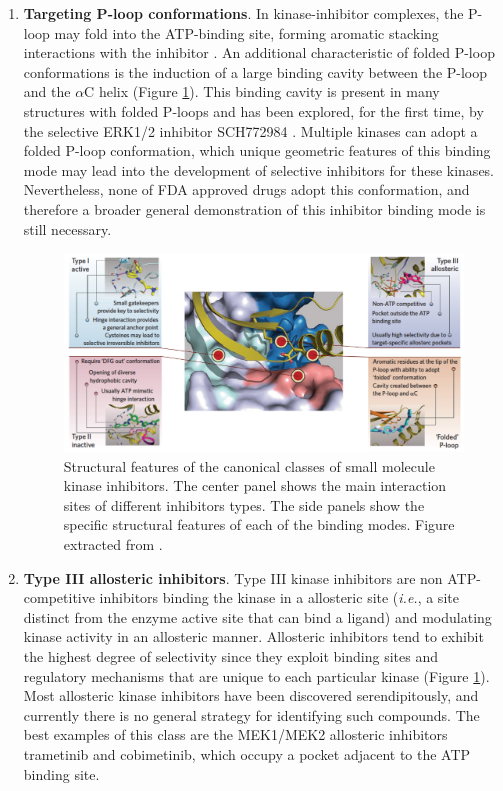 \documentclass[11pt, b5paper,twoside]{tesi_upf}
\begin{document}
\begin{enumerate}
\item \textbf{Targeting P-loop conformations}. In kinase-inhibitor complexes, the P-loop may fold into the ATP-binding site, forming aromatic stacking interactions with the inhibitor \cite{Guimaraes2011}. An additional characteristic of folded P-loop conformations is the induction of a large binding cavity between the P-loop and the $\alpha$C helix (Figure \ref{fig:type_inhibitors}). This binding cavity is present in many structures with folded P-loops and has been explored, for the first time, by the selective ERK1/2 inhibitor SCH772984 \cite{Morris2013}. Multiple kinases can adopt a folded P-loop conformation, which unique geometric features of this binding mode may lead into the development of selective inhibitors for these kinases. Nevertheless, none of FDA approved drugs adopt this conformation, and therefore a broader general demonstration of this inhibitor binding mode is still necessary. 
\begin{figure}[htbp]
	\includegraphics[width=1\linewidth]{../figures/type_kinases_inhibitors.pdf}
	\caption[Structural features of the canonical classes of small molecule kinase inhibitors]{Structural features of the canonical classes of small molecule kinase inhibitors. The center panel shows the main interaction sites of different inhibitors types. The side panels show the specific structural features of each of the binding modes. Figure extracted from \cite{Muller2015}.}
	\label{fig:type_inhibitors}
	\vspace*{4mm}
\end{figure}
\item \textbf{Type III allosteric inhibitors}. Type III kinase inhibitors are non ATP-competitive inhibitors binding the kinase in a allosteric site (\textit{i.e.}, a site distinct from the enzyme active site that can bind a ligand) and modulating kinase activity in an allosteric manner. Allosteric inhibitors tend to exhibit the highest degree of selectivity since they exploit binding sites and regulatory mechanisms that are unique to each particular kinase (Figure \ref{fig:type_inhibitors}). Most allosteric kinase inhibitors have been discovered serendipitously, and currently there is no general strategy for identifying such compounds. The best examples of this class are the MEK1/MEK2 allosteric inhibitors trametinib and cobimetinib, which occupy a pocket adjacent to the ATP binding site. 


\end{enumerate}
\end{document}
